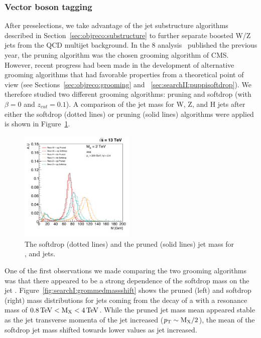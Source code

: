 \subsubsection{Vector boson tagging}
\label{sec:searchI:wtagging}
After preselections, we take advantage of the jet substructure algorithms described in Section~\ref{sec:objreco:substructure} to further separate boosted W/Z jets from the QCD multijet background. In the 8 \TeV analysis~\cite{Khachatryan:1700394} published the previous year, the pruning algorithm was the chosen grooming algorithm of CMS. However, recent progress had been made in the development of alternative grooming algorithms that had favorable properties from a theoretical point of view (see Sections~\ref{sec:objreco:grooming} and ~\ref{sec:searchII:puppisoftdrop}). We therefore studied two different grooming algorithms: pruning and softdrop (with $\beta=0$ and $z_{cut} = 0.1$). A comparison of the jet mass for W, Z, and H jets after either the softdrop (dotted lines) or pruning (solid lines) algorithms were applied is shown in Figure~\ref{fig:searchI:sdvspruning}.
 \begin{figure}[h!]
 \centering
 \includegraphics[width=0.49\textwidth]{figures/analysis/search1/misc/SDvsPruned.pdf}
 \caption{The softdrop (dotted lines) and the pruned (solid lines) jet mass for \PW, \PZ and \PH jets.}
 \label{fig:searchI:sdvspruning}
 \end{figure}
One of the first observations we made comparing the two grooming algorithms was that there appeared to be a strong dependence of the softdrop mass on the jet \PT. Figure~\ref{fig:searchI:grommedmassshift} shows the pruned (left) and softdrop (right) mass distributions for \PW jets coming from the decay of a \BulkG with a resonance mass of $0.8 \,\text{Te\hspace{-.08em}V} < \text{M}_{\text{X}} < 4 \,\text{Te\hspace{-.08em}V}$. While the pruned jet mass mean appeared stable as the jet transverse momenta of the jet increased ($p_{\mathrm{T}}\sim\text{M}_{\text{X}}/2$), the mean of the softdrop jet mass shifted towards lower values as jet \PT increased.
